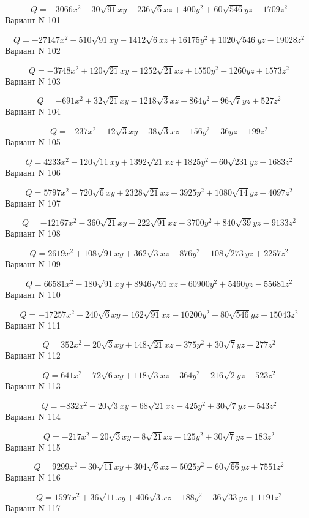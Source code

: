 \documentclass[11pt]{report}
\begin{document}
$$Q = - 3066 x^{2} - 30 \sqrt{91} x y - 236 \sqrt{6} x z + 400 y^{2} + 60 \sqrt{546} y z - 1709 z^{2}$$Вариант N 101

$$Q = - 27147 x^{2} - 510 \sqrt{91} x y - 1412 \sqrt{6} x z + 16175 y^{2} + 1020 \sqrt{546} y z - 19028 z^{2}$$Вариант N 102

$$Q = - 3748 x^{2} + 120 \sqrt{21} x y - 1252 \sqrt{21} x z + 1550 y^{2} - 1260 y z + 1573 z^{2}$$Вариант N 103

$$Q = - 691 x^{2} + 32 \sqrt{21} x y - 1218 \sqrt{3} x z + 864 y^{2} - 96 \sqrt{7} y z + 527 z^{2}$$Вариант N 104

$$Q = - 237 x^{2} - 12 \sqrt{3} x y - 38 \sqrt{3} x z - 156 y^{2} + 36 y z - 199 z^{2}$$Вариант N 105

$$Q = 4233 x^{2} - 120 \sqrt{11} x y + 1392 \sqrt{21} x z + 1825 y^{2} + 60 \sqrt{231} y z - 1683 z^{2}$$Вариант N 106

$$Q = 5797 x^{2} - 720 \sqrt{6} x y + 2328 \sqrt{21} x z + 3925 y^{2} + 1080 \sqrt{14} y z - 4097 z^{2}$$Вариант N 107

$$Q = - 12167 x^{2} - 360 \sqrt{21} x y - 222 \sqrt{91} x z - 3700 y^{2} + 840 \sqrt{39} y z - 9133 z^{2}$$Вариант N 108

$$Q = 2619 x^{2} + 108 \sqrt{91} x y + 362 \sqrt{3} x z - 876 y^{2} - 108 \sqrt{273} y z + 2257 z^{2}$$Вариант N 109

$$Q = 66581 x^{2} - 180 \sqrt{91} x y + 8946 \sqrt{91} x z - 60900 y^{2} + 5460 y z - 55681 z^{2}$$Вариант N 110

$$Q = - 17257 x^{2} - 240 \sqrt{6} x y - 162 \sqrt{91} x z - 10200 y^{2} + 80 \sqrt{546} y z - 15043 z^{2}$$Вариант N 111

$$Q = 352 x^{2} - 20 \sqrt{3} x y + 148 \sqrt{21} x z - 375 y^{2} + 30 \sqrt{7} y z - 277 z^{2}$$Вариант N 112

$$Q = 641 x^{2} + 72 \sqrt{6} x y + 118 \sqrt{3} x z - 364 y^{2} - 216 \sqrt{2} y z + 523 z^{2}$$Вариант N 113

$$Q = - 832 x^{2} - 20 \sqrt{3} x y - 68 \sqrt{21} x z - 425 y^{2} + 30 \sqrt{7} y z - 543 z^{2}$$Вариант N 114

$$Q = - 217 x^{2} - 20 \sqrt{3} x y - 8 \sqrt{21} x z - 125 y^{2} + 30 \sqrt{7} y z - 183 z^{2}$$Вариант N 115

$$Q = 9299 x^{2} + 30 \sqrt{11} x y + 304 \sqrt{6} x z + 5025 y^{2} - 60 \sqrt{66} y z + 7551 z^{2}$$Вариант N 116

$$Q = 1597 x^{2} + 36 \sqrt{11} x y + 406 \sqrt{3} x z - 188 y^{2} - 36 \sqrt{33} y z + 1191 z^{2}$$Вариант N 117
\end{document}
